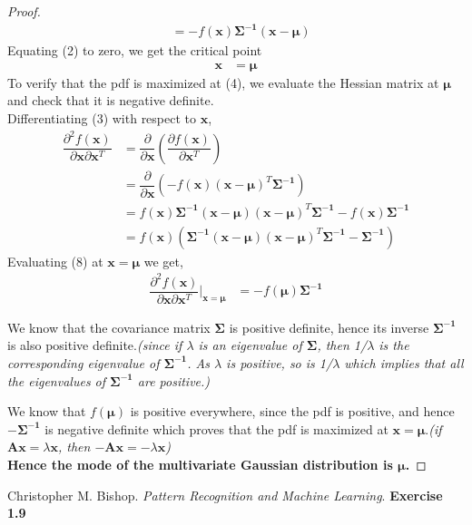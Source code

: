 \documentclass[14pt]{extarticle}
\begin{document}
\begin{flushleft}
\begin{large}
\begin{proof}
\begin{align}
&= -f(\mathbf{x})\mathbf{\Sigma^{-1}\left(x-\boldsymbol{\mu}\right)}
\end{align} 
\hfill \break
Equating (2) to zero, we get the critical point
\begin{align}
\mathbf{x} &= \boldsymbol{\mu}
\end{align}
\hfill \break
To verify that the pdf is maximized at (4), we evaluate the Hessian matrix at $\boldsymbol{\mu}$ and check that it is negative definite.\\
\hfill \break
Differentiating (3) with respect to $\mathbf{x}$,
\begin{align}
\dfrac{\partial^2 f(\mathbf{x})}{\partial \mathbf{x} \partial \mathbf{x}^T} &= \dfrac{\partial}{\partial \mathbf{x}}\left(\dfrac{\partial f(\mathbf{x})}{\partial  \mathbf{x}^T}\right)\\
&= \dfrac{\partial}{\partial \mathbf{x}}\left(-f(\mathbf{x})\left(\mathbf{x}   - \boldsymbol{\mu}\right)^T \boldsymbol{\Sigma^{-1}}\right)\\
&= f(\mathbf{x})\mathbf{\Sigma^{-1}\left(x-\boldsymbol{\mu}\right)}\left(\mathbf{x} - \boldsymbol{\mu}\right)^T \boldsymbol{\Sigma^{-1}} - f(\mathbf{x})\boldsymbol{\Sigma^{-1}}\\
&= f(\mathbf{x})\left(\mathbf{\Sigma^{-1}\left(x-\boldsymbol{\mu}\right)}\left(\mathbf{x} - \boldsymbol{\mu}\right)^T \boldsymbol{\Sigma^{-1}} - \boldsymbol{\Sigma^{-1}}\right)
\end{align}
Evaluating (8) at $\mathbf{x} = \boldsymbol{\mu}$ we get,
\begin{align}
\dfrac{\partial^2 f(\mathbf{x})}{\partial \mathbf{x} \partial \mathbf{x}^T}\Bigr|_{\mathbf{x}=\boldsymbol{\mu}} &= -f(\boldsymbol{\mu}) \boldsymbol{\Sigma^{-1}}
\end{align}
\begin{minipage}{35em}
We know that the covariance matrix $\boldsymbol{\Sigma}$ is positive definite, hence its inverse $\boldsymbol{\Sigma^{-1}}$ is also positive definite.\emph{(since if $\lambda$ is an eigenvalue of $\boldsymbol{\Sigma}$, then 1/$\lambda$ is the corresponding eigenvalue of $\boldsymbol{\Sigma^{-1}}$. As $\lambda$ is positive, so is 1/$\lambda$ which implies that all the eigenvalues of $\boldsymbol{\Sigma^{-1}}$ are positive.)}\\
\end{minipage}
\begin{minipage}{35em}
We know that $f(\boldsymbol{\mu})$ is positive everywhere, since the pdf is positive, and hence $-\boldsymbol{\Sigma^{-1}}$ is negative definite which proves that the pdf is maximized at $\mathbf{x} = \boldsymbol{\mu}$.\emph{(if $\mathbf{Ax} = \lambda\mathbf{x}$, then $-\mathbf{Ax} = -\lambda\mathbf{x}$)}\\

\textbf{Hence the mode of the multivariate Gaussian distribution is $\boldsymbol{\mu}$.}
\end{minipage}
\end{proof}	
\end{large}
\end{flushleft}
\begin{thebibliography}{9}
Christopher M. Bishop. 
\textit{ Pattern Recognition and Machine Learning}.  
\textbf{Exercise 1.9}
\end{thebibliography}
\end{document}
